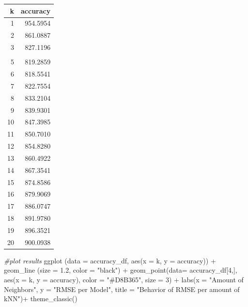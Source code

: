 \documentclass[
]{article}
\newenvironment{Shaded}{\begin{snugshade}}{\end{snugshade}}
\newcommand{\AttributeTok}[1]{\textcolor[rgb]{0.77,0.63,0.00}{#1}}
\newcommand{\CommentTok}[1]{\textcolor[rgb]{0.56,0.35,0.01}{\textit{#1}}}
\newcommand{\DecValTok}[1]{\textcolor[rgb]{0.00,0.00,0.81}{#1}}
\newcommand{\FloatTok}[1]{\textcolor[rgb]{0.00,0.00,0.81}{#1}}
\newcommand{\FunctionTok}[1]{\textcolor[rgb]{0.00,0.00,0.00}{#1}}
\newcommand{\NormalTok}[1]{#1}
\newcommand{\SpecialCharTok}[1]{\textcolor[rgb]{0.00,0.00,0.00}{#1}}
\newcommand{\StringTok}[1]{\textcolor[rgb]{0.31,0.60,0.02}{#1}}
\begin{document}
\begin{table}
\centering
\begin{tabular}[t]{r|r}
\hline
k & accuracy\\
\hline
1 & 954.5954\\
\hline
2 & 861.0887\\
\hline
3 & 827.1196\\
\hline
\cellcolor[HTML]{D8B365}{\textcolor{white}{\textbf{4}}} & \cellcolor[HTML]{D8B365}{\textcolor{white}{\textbf{814.5940}}}\\
\hline
5 & 819.2859\\
\hline
6 & 818.5541\\
\hline
7 & 822.7554\\
\hline
8 & 833.2104\\
\hline
9 & 839.9301\\
\hline
10 & 847.3985\\
\hline
11 & 850.7010\\
\hline
12 & 854.8280\\
\hline
13 & 860.4922\\
\hline
14 & 867.3541\\
\hline
15 & 874.8586\\
\hline
16 & 879.9069\\
\hline
17 & 886.0747\\
\hline
18 & 891.9780\\
\hline
19 & 896.3521\\
\hline
20 & 900.0938\\
\hline
\end{tabular}
\end{table}

\begin{Shaded}
\begin{Highlighting}[]
\CommentTok{\#plot results}
\FunctionTok{ggplot}\NormalTok{ (}\AttributeTok{data =}\NormalTok{ accuracy\_df, }\FunctionTok{aes}\NormalTok{(}\AttributeTok{x =}\NormalTok{ k, }\AttributeTok{y =}\NormalTok{ accuracy)) }\SpecialCharTok{+}
  \FunctionTok{geom\_line}\NormalTok{ (}\AttributeTok{size =} \FloatTok{1.2}\NormalTok{, }\AttributeTok{color =} \StringTok{"black"}\NormalTok{) }\SpecialCharTok{+}
  \FunctionTok{geom\_point}\NormalTok{(}\AttributeTok{data=}\NormalTok{ accuracy\_df[}\DecValTok{4}\NormalTok{,], }\FunctionTok{aes}\NormalTok{(}\AttributeTok{x =}\NormalTok{ k, }\AttributeTok{y =}\NormalTok{ accuracy), }\AttributeTok{color =} \StringTok{"\#D8B365"}\NormalTok{, }\AttributeTok{size =} \DecValTok{3}\NormalTok{) }\SpecialCharTok{+}
  \FunctionTok{labs}\NormalTok{(}\AttributeTok{x =} \StringTok{"Amount of Neighbors"}\NormalTok{, }\AttributeTok{y =} \StringTok{"RMSE per Model"}\NormalTok{, }\AttributeTok{title =} \StringTok{"Behavior of RMSE per amount of kNN"}\NormalTok{)}\SpecialCharTok{+}
  \FunctionTok{theme\_classic}\NormalTok{() }
\end{Highlighting}
\end{Shaded}
\end{document}
